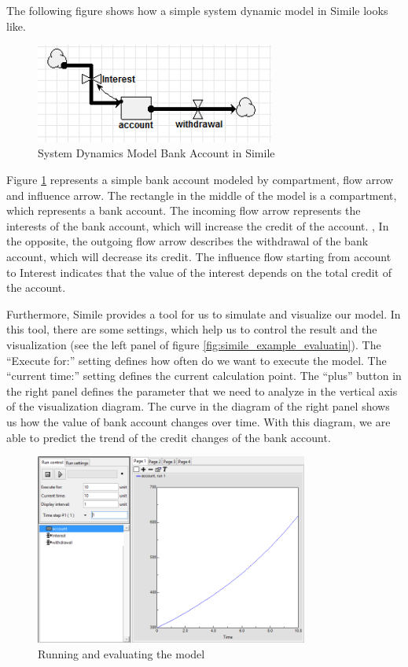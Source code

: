 \par
The following figure shows how a simple system dynamic model in Simile looks like.
\begin{figure}[h]
	\centering
	\includegraphics[width=0.7\textwidth]{pics/simile/simile_example_bank_account.png}
	\caption{System Dynamics Model Bank Account in Simile \label{fig:simile_example_bank}}	
\end{figure}
\par
Figure \ref{fig:simile_example_bank} represents a simple bank account modeled by compartment, flow arrow and influence arrow. The rectangle in the middle of the model is a compartment, which represents a bank account. The incoming flow arrow represents the interests of the bank account, which will increase the credit of the account. , In the opposite, the outgoing flow arrow describes the withdrawal of the bank account, which will decrease its credit. The influence flow starting from account to Interest indicates that the value of the interest depends on the total credit of the account.
\par
Furthermore, Simile provides a tool for us to simulate and visualize our model. In this tool, there are some settings, which help us to control the result and the visualization (see the left panel of figure \ref{fig:simile_example_evaluatin}). The “Execute for:” setting defines how often do we want to execute the model. The “current time:” setting defines the current calculation point. The “plus” button in the right panel defines the parameter that we need to analyze in the vertical axis of the visualization diagram. The curve in the diagram of the right panel shows us how the value of bank account changes over time. With this diagram, we are able to predict the trend of the credit changes of the bank account.
\begin{figure}[h]
	\centering
	\includegraphics[width=0.8\textwidth]{pics/simile/simile_example_evaluating_model.png}
	\caption{Running and evaluating the model \label{fig:simile_example_evaluating}}	
\end{figure}
